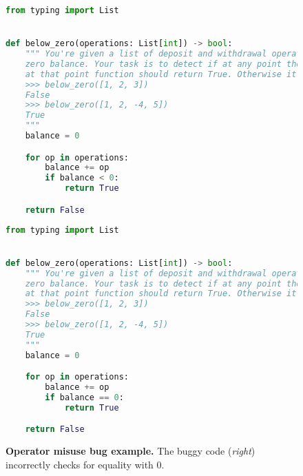 \begin{figure}[htbp]
\centering
\begin{minipage}{0.45\textwidth}
\begin{lstlisting}[language=Python,breaklines=true,basicstyle=\ttfamily\scriptsize]
from typing import List


def below_zero(operations: List[int]) -> bool:
    """ You're given a list of deposit and withdrawal operations on a bank account that starts with
    zero balance. Your task is to detect if at any point the balance of account fallls below zero, and
    at that point function should return True. Otherwise it should return False.
    >>> below_zero([1, 2, 3])
    False
    >>> below_zero([1, 2, -4, 5])
    True
    """
    balance = 0

    for op in operations:
        balance += op
        if balance < 0:
            return True

    return False
\end{lstlisting}
\end{minipage}\hfill
\begin{minipage}{0.45\textwidth}
\begin{lstlisting}[language=Python,breaklines=true,basicstyle=\ttfamily\scriptsize]
from typing import List


def below_zero(operations: List[int]) -> bool:
    """ You're given a list of deposit and withdrawal operations on a bank account that starts with
    zero balance. Your task is to detect if at any point the balance of account fallls below zero, and
    at that point function should return True. Otherwise it should return False.
    >>> below_zero([1, 2, 3])
    False
    >>> below_zero([1, 2, -4, 5])
    True
    """
    balance = 0

    for op in operations:
        balance += op
        if balance == 0:
            return True

    return False
\end{lstlisting}
\end{minipage}
\caption{\textbf{Operator misuse bug example.} The buggy code (\emph{right}) incorrectly checks for equality with 0.}
\label{fig:operatormisuse}
\end{figure}


